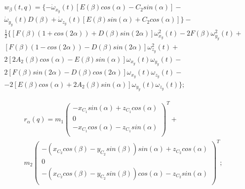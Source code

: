 \begin{equation}
\label{eq:p3:48+3}
\begin{multlined}
w_{ \beta } \left( t,q \right) = 
\lbrace 
- \dot \omega _{x_{y}} \left( t \right) \left[ E \left( \beta \right) cos \left( \alpha \right) -C_{2}^{}sin \left( \alpha \right) \right] -\\
\dot \omega _{y_{y}} \left( t \right) D \left( \beta \right) + 
\dot \omega _{z_{y}} \left( t \right) \left[ E \left( \beta \right) sin \left( \alpha \right) +C_{2}cos \left( \alpha \right) \right] \rbrace -\\
\frac{1}{2} \lbrace \left[ F \left( \beta \right) \left( 1+cos \left( 2 \alpha \right) \right) +D \left( \beta \right) sin \left( 2 \alpha \right) \right] \omega _{x_{y}}^{2} \left( t \right) -2F \left( \beta \right) \omega _{y_{y}}^{2} \left( t \right) +\\
\left[ F \left( \beta \right) \left( 1-cos \left( 2 \alpha \right) \right) -D \left( \beta \right) sin \left( 2 \alpha \right) \right] \omega _{z_{y}}^{2} \left( t \right) +\\
2 \left[ 2A_{2} \left( \beta \right) cos \left( \alpha \right) -E \left( \beta \right) sin \left( \alpha \right) \right] \omega _{x_{y}} \left( t \right) \omega _{y_{y}} \left( t \right) -\\
2 \left[ F \left( \beta \right) sin \left( 2 \alpha \right) -D \left( \beta \right) cos \left( 2 \alpha \right) \right] \omega _{x_{y}} \left( t \right) \omega _{z_{y}} \left( t \right) -\\
-2 \left[ E \left( \beta \right) cos \left( \alpha \right) +2A_{2} \left( \beta \right) sin \left( \alpha \right) \right] \omega _{y_{y}} \left( t \right) \omega _{z_{y}} \left( t \right) \rbrace ;
\end{multlined}
\end{equation}


\begin{equation}
\label{eq:p3:48+4}
\begin{multlined}
r_{ \alpha } \left( q \right) =m_{1} \left( \begin{matrix}
-x_{C_{1}}sin \left( \alpha \right) +z_{C_{1}}cos \left( \alpha \right) \\
0\\
-x_{C_{1}}cos \left( \alpha \right) -z_{C_{1}}sin \left( \alpha \right) \\
\end{matrix}
\right) ^{T}+\\
m_{2} \left( \begin{matrix}
- \left( x_{C_{2}}cos \left( \beta \right) -y_{C_{2}}sin \left( \beta \right) \right) sin \left( \alpha \right) +z_{C_{2}}cos \left( \alpha \right) \\
0\\
- \left( x_{C_{2}}cos \left( \beta \right) -y_{C_{2}}sin \left( \beta \right) \right) cos \left( \alpha \right) -z_{C_{2}}sin \left( \alpha \right) \\
\end{matrix}
\right) ^{T};
\end{multlined}
\end{equation}

